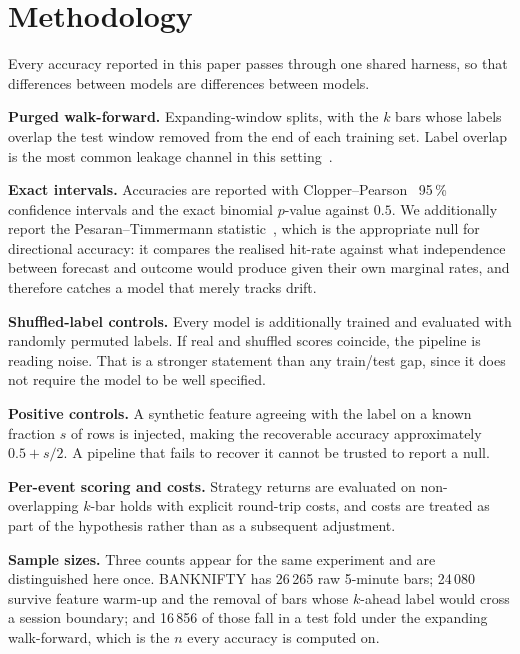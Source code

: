 \documentclass[conference]{IEEEtran}
\begin{document}
\section{Methodology}
\label{sec:method}

Every accuracy reported in this paper passes through one shared harness, so that
differences between models are differences between models.

\textbf{Purged walk-forward.} Expanding-window splits, with the $k$ bars whose
labels overlap the test window removed from the end of each training set. Label
overlap is the most common leakage channel in this setting~\cite{prado2018}.

\textbf{Exact intervals.} Accuracies are reported with Clopper--Pearson~\cite{clopper1934} 95\,\%
confidence intervals and the exact binomial $p$-value against $0.5$. We
additionally report the Pesaran--Timmermann statistic~\cite{pt1992}, which is
the appropriate null for directional accuracy: it compares the realised
hit-rate against what independence between forecast and outcome would produce
given their own marginal rates, and therefore catches a model that merely tracks
drift.

\textbf{Shuffled-label controls.} Every model is additionally trained and
evaluated with randomly permuted labels. If real and shuffled scores coincide,
the pipeline is reading noise. That is a stronger statement than any train/test
gap, since it does not require the model to be well specified.

\textbf{Positive controls.} A synthetic feature agreeing with the label on a
known fraction $s$ of rows is injected, making the recoverable accuracy
approximately $0.5 + s/2$. A pipeline that fails to recover it cannot be trusted
to report a null.

\textbf{Per-event scoring and costs.} Strategy returns are evaluated on
non-overlapping $k$-bar holds with explicit round-trip costs, and costs are
treated as part of the hypothesis rather than as a subsequent adjustment.

\textbf{Sample sizes.} Three counts appear for the same experiment and are
distinguished here once. BANKNIFTY has 26\,265 raw 5-minute bars; 24\,080 survive
feature warm-up and the removal of bars whose $k$-ahead label would cross a
session boundary; and 16\,856 of those fall in a test fold under the expanding
walk-forward, which is the $n$ every accuracy is computed on.
\end{document}
